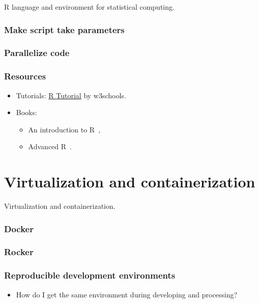 \documentclass[aspectratio=169]{beamer}
\begin{document}
\begin{frame}
    R language and environment for statistical computing.
\end{frame}

\begin{frame}
    \frametitle{Make script take parameters}
\end{frame}

\begin{frame}
    \frametitle{Parallelize code}
\end{frame}

\begin{frame}
    \frametitle{Resources}
    \begin{itemize}
        \item Tutorials: \href{https://www.w3schools.com/r/default.asp}
            {R Tutorial} by w3schools.
        \item Books: 
            \begin{itemize}
                \item An introduction to R~\cite{venables2024},
                \item Advanced R~\cite{wickham2015a}.
            \end{itemize}
    \end{itemize}
\end{frame}






\section{Virtualization and containerization}



\begin{frame}
    Virtualization and containerization.
\end{frame}

\begin{frame}
    \frametitle{Docker}
\end{frame}

\begin{frame}
    \frametitle{Rocker}
\end{frame}

\begin{frame}
    \frametitle{Reproducible development environments}
    \begin{itemize}
        \item How do I get the same environment during developing and 
            processing?
    \end{itemize}
\end{frame}
\end{document}
